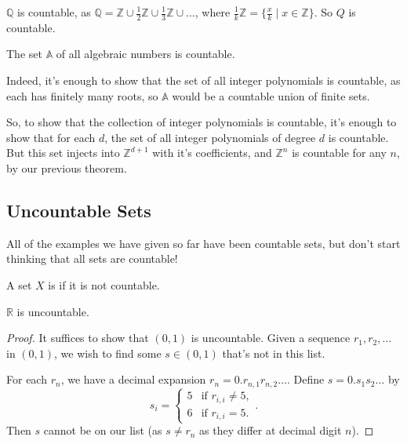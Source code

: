 \documentclass[a4paper]{scrartcl}
\begin{document}
\begin{example}
	$\mathbb{Q}$ is countable, as $\mathbb{Q} = \mathbb{Z} \cup \frac{1}{2}\mathbb{Z} \cup \frac{1}{3}\mathbb{Z} \cup \dots$, where $\frac{1}{k}\mathbb{Z} = \{\frac{x}{k} \mid x \in \mathbb{Z}\}$. So $Q$ is countable.
\end{example}
\begin{example}
	The set $\mathbb{A}$ of all algebraic numbers is countable. 
	
	Indeed, it's enough to show that the set of all integer polynomials is countable, as each has finitely many roots, so $\mathbb{A}$ would be a countable union of finite sets.

	So, to show that the collection of integer polynomials is countable, it's enough to show that for each $d$, the set of all integer polynomials of degree $d$ is countable. But this set injects into $\mathbb{Z}^{d + 1}$ with it's coefficients, and $\mathbb{Z}^n$ is countable for any $n$, by our previous theorem.
\end{example}

\subsection{Uncountable Sets}

All of the examples we have given so far have been countable sets, but don't start thinking that all sets are countable! 

\begin{definition}[Uncountability]
	A set $X$ is  if it is not countable.
\end{definition}


\begin{theorem}
	$\mathbb{R}$ is uncountable.
\end{theorem}
\begin{proof}
	It suffices to show that $(0, 1)$ is uncountable. Given a sequence $r_1, r_2, \dots$ in $(0, 1)$, we wish to find some $s \in (0, 1)$ that's not in this list.
	
	For each $r_n$, we have a decimal expansion $r_n = 0.r_{n,1} r_{n,2}\dots$. Define $s = 0.s_1 s_2\dots$ by
	$$
	s_i = \begin{cases}
		5 &\mbox{if } r_{i, i} \neq 5, \\
		6 &\mbox{if } r_{i, i} = 5.
	   \end{cases}.
	$$
	Then $s$ cannot be on our list (as $s \neq r_n$ as they differ at decimal digit $n$).
\end{proof}
\end{document}
